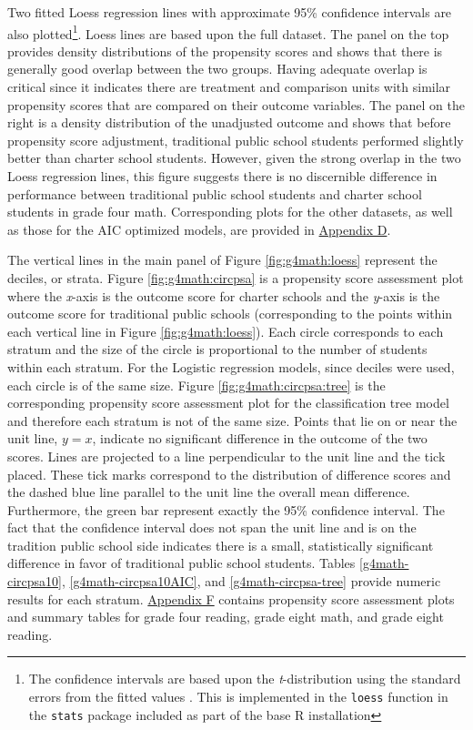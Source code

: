 \documentclass[letterpaper,12p,twoside]{article} %
\begin{document}
Two fitted Loess regression lines with approximate 95\% confidence intervals are also plotted\footnote{The confidence intervals are based upon the \textit{t}-distribution using the standard errors from the fitted values \cite{Cleveland1992}. This is implemented in the \texttt{loess} function in the \texttt{stats} package included as part of the base R \cite{rdevelopment} installation}. Loess lines are based upon the full dataset. The panel on the top provides density distributions of the propensity scores and shows that there is generally good overlap between the two groups. Having adequate overlap is critical since it indicates there are treatment and comparison units with similar propensity scores that are compared on their outcome variables. The panel on the right is a density distribution of the unadjusted outcome and shows that before propensity score adjustment, traditional public school students performed slightly better than charter school students. However, given the strong overlap in the two Loess regression lines, this figure suggests there is no discernible difference in performance between traditional public school students and charter school students in grade four math. Corresponding plots for the other datasets, as well as those for the AIC optimized models, are provided in \hyperref[appendixD]{Appendix D}.

The vertical lines in the main panel of Figure \ref{fig:g4math:loess} represent the deciles, or strata. Figure \ref{fig:g4math:circpsa} is a propensity score assessment plot \cite{HelmreichPruzek2009} where the \textit{x}-axis is the outcome score for charter schools and the \textit{y}-axis is the outcome score for traditional public schools (corresponding to the points within each vertical line in Figure \ref{fig:g4math:loess}). Each circle corresponds to each stratum and the size of the circle is proportional to the number of students within each stratum. For the Logistic regression models, since deciles were used, each circle is of the same size. Figure \ref{fig:g4math:circpsa:tree} is the corresponding propensity score assessment plot for the classification tree model and therefore each stratum is not of the same size. Points that lie on or near the unit line, $y = x$, indicate no significant difference in the outcome of the two scores. Lines are projected to a line perpendicular to the unit line and the tick placed. These tick marks correspond to the distribution of difference scores and the dashed blue line parallel to the unit line the overall mean difference. Furthermore, the green bar represent exactly the 95\% confidence interval. The fact that the confidence interval does not span the unit line and is on the tradition public school side indicates there is a small, statistically significant difference in favor of traditional public school students. Tables \ref{g4math-circpsa10}, \ref{g4math-circpsa10AIC}, and \ref{g4math-circpsa-tree} provide numeric results for each stratum. \hyperref[appendixF]{Appendix F} contains propensity score assessment plots and summary tables for grade four reading, grade eight math, and grade eight reading.
\end{document}
